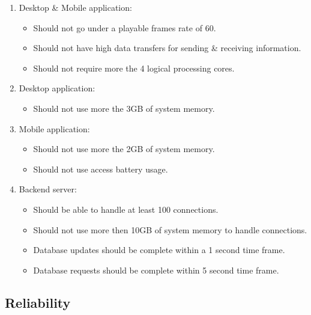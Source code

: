 \documentclass[letterpaper]{article}
\begin{document}
		\begin{enumerate}
			\item Desktop \& Mobile application:
				\begin{itemize}
					\item Should not go under a playable frames rate of 60.
					\item Should not have high data transfers for sending \& receiving information.
					\item Should not require more the 4 logical processing cores.
				\end{itemize}
		
			\item Desktop application:
				\begin{itemize}
					\item Should not use more the 3GB of system memory.
				\end{itemize}
		
			\item Mobile application:
				\begin{itemize}
					\item Should not use more the 2GB of system memory.
					\item Should not use access battery usage.
				\end{itemize}
				
			\item Backend server:
				\begin{itemize}
					\item Should be able to handle at least 100 connections.
					\item Should not use more then 10GB of system memory to handle connections.
					\item Database updates should be complete within a 1 second time frame.
					\item Database requests should be complete within 5 second time frame.
				\end{itemize}
		\end{enumerate}
		
		\subsection*{Reliability}
		\vspace{0.1in}
		
\end{document}
